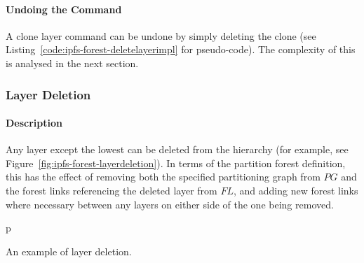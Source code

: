 \paragraph{Undoing the Command}

A clone layer command can be undone by simply deleting the clone (see Listing~\ref{code:ipfs-forest-deletelayerimpl} for pseudo-code). The complexity of this is analysed in the next section.

\afterpage{\clearpage}
\newpage

\subsubsection{Layer Deletion}

\paragraph{Description}

Any layer except the lowest can be deleted from the hierarchy (for example, see Figure~\ref{fig:ipfs-forest-layerdeletion}). In terms of the partition forest definition, this has the effect of removing both the specified partitioning graph from $\textit{PG}$ and the forest links referencing the deleted layer from $\textit{FL}$, and adding new forest links where necessary between any layers on either side of the one being removed.

\begin{stusubfig}{p}
	\\
\caption{An example of layer deletion.}
\label{fig:ipfs-forest-layerdeletion}
\end{stusubfig}

